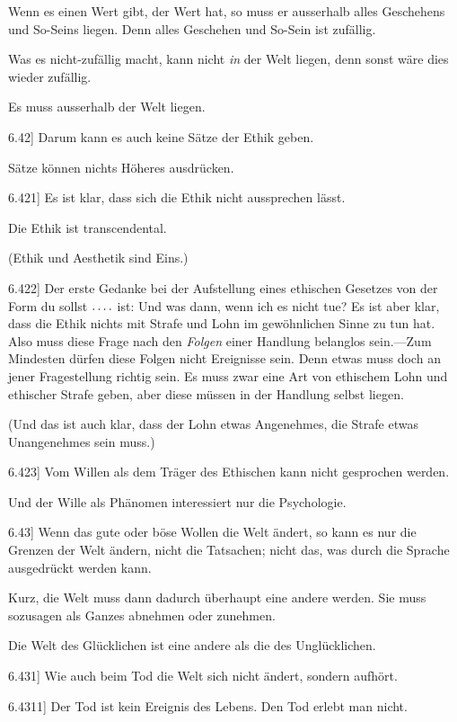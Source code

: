 \documentclass[12pt,oneside]{book}[2007/10/19]
\newcommand{\PropERef}[1]{\hyperref[PropE:#1]{#1}}
\newcommand{\PropositionG}[2]{%
  \item[\phantomsection\label{PropG:#1}\PropERef{#1}] #2%
}
\newcommand{\DPtypo}[2]{#2}
\newcommand{\Emph}[1]{\emph{#1}}%
\newcommand{\fourdots}{\mathinner{\ldotp\ldotp\ldotp\ldotp}}
\begin{document}
\begin{propositions}
{Wenn es einen Wert gibt, der Wert hat, so muss
er ausserhalb alles Geschehens und So-Seins liegen.
Denn alles Geschehen und So-Sein ist zufällig.

Was es nicht-zufällig macht, kann nicht \Emph{in} der
Welt liegen, denn sonst wäre dies wieder zufällig.

Es muss ausserhalb der Welt liegen.}


\PropositionG{6.42}
{Darum kann es auch keine Sätze der Ethik geben.

Sätze können nichts Höheres ausdrücken.}


\PropositionG{6.421}
{Es ist klar, dass sich die Ethik nicht aussprechen
lässt.

Die Ethik ist \DPtypo{transscendental}{transcendental}.

(Ethik und Aesthetik sind Eins.)}


\PropositionG{6.422}
{Der erste Gedanke bei der Aufstellung eines
ethischen Gesetzes von der Form \glqq{}du sollst $\fourdots$\grqq{}
ist: Und was dann, wenn ich es nicht tue? Es ist
aber klar, dass die Ethik nichts mit Strafe und
Lohn im gewöhnlichen Sinne zu tun hat. Also
muss diese Frage nach den \Emph{Folgen} einer Handlung
belanglos sein.---Zum Mindesten dürfen diese
Folgen nicht Ereignisse sein. Denn etwas muss
doch an jener Fragestellung richtig sein. Es muss
zwar eine Art von ethischem Lohn und ethischer
Strafe geben, aber diese müssen in der Handlung
selbst liegen.

(Und das ist auch klar, dass der Lohn etwas
Angenehmes, die Strafe etwas Unangenehmes sein
muss.)}


\PropositionG{6.423}
{Vom Willen als dem Träger des Ethischen kann
nicht gesprochen werden.

Und der Wille als Phänomen interessiert nur
die Psychologie.}


\PropositionG{6.43}
{Wenn das gute oder böse Wollen die Welt
ändert, so kann es nur die Grenzen der Welt ändern,
nicht die Tatsachen; nicht das, was durch die
Sprache ausgedrückt werden kann.

Kurz, die Welt muss dann dadurch überhaupt
eine andere werden. Sie muss sozusagen als
Ganzes abnehmen oder zunehmen.

Die Welt des Glücklichen ist eine andere als die
des Unglücklichen.}


\PropositionG{6.431}
{Wie auch beim Tod die Welt sich nicht ändert,
sondern aufhört.}


\PropositionG{6.4311}
{Der Tod ist kein Ereignis des Lebens. Den
Tod erlebt man nicht.

}
\end{propositions}
\end{document}
